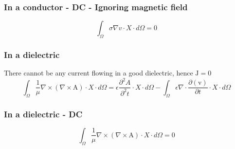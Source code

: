 \documentclass[10pt]{article}         %
\begin{document}
\subsubsection{In a conductor - DC - Ignoring magnetic field}
\[ \int_{\Omega} \sigma \nabla v \cdot X \cdot {d}\Omega = 0    \]

\subsubsection{In a dielectric}
There cannot be any current flowing in a good dielectric, hence $\mathrm{ J } = 0 $
\[ \int_{\Omega} \frac{1}{\mu} \nabla \times ( \nabla \times \mathrm{A} ) \cdot X \cdot {d}\Omega = \epsilon \frac{ \partial ^2 A }{ \partial ^2 t } \cdot X \cdot {d}\Omega - \int_{\Omega} \epsilon \nabla \cdot \frac{ \partial \left( \mathrm{v}  \right)
}{ \partial t } \cdot X \cdot {d}\Omega  \]


\subsubsection{In a dielectric - DC}
\[ \int_{\Omega} \frac{1}{\mu} \nabla \times ( \nabla \times \mathrm{A} ) \cdot X \cdot {d}\Omega =0 \]
\end{document}
